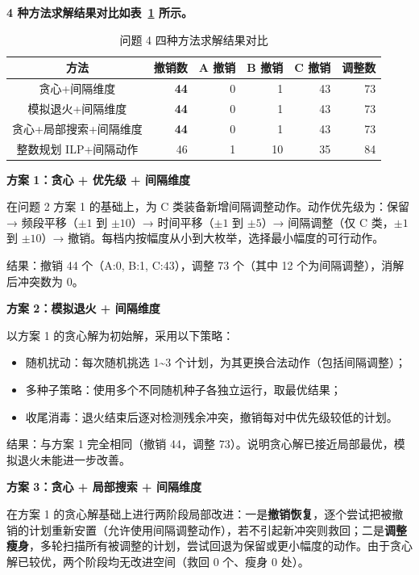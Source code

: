 
\textbf{4 种方法求解结果对比如表~\ref{tab:q4_compare} 所示。}

\begin{table}[htbp]
\centering
\caption{问题 4 四种方法求解结果对比}
\label{tab:q4_compare}
\begin{tabular}{crrrrr}
\toprule
方法 & 撤销数 & A 撤销 & B 撤销 & C 撤销 & 调整数 \\
\midrule
贪心+间隔维度 & \textbf{44} & 0 & 1 & 43 & 73 \\
模拟退火+间隔维度 & \textbf{44} & 0 & 1 & 43 & 73 \\
贪心+局部搜索+间隔维度 & \textbf{44} & 0 & 1 & 43 & 73 \\
整数规划 ILP+间隔动作 & 46 & 1 & 10 & 35 & 84 \\
\bottomrule
\end{tabular}
\end{table}

\textbf{方案 1：贪心 + 优先级 + 间隔维度}

在问题 2 方案 1 的基础上，为 C 类装备新增间隔调整动作。动作优先级为：保留 → 频段平移（$\pm 1$ 到 $\pm 10$）→ 时间平移（$\pm 1$ 到 $\pm 5$）→ 间隔调整（仅 C 类，$\pm 1$ 到 $\pm 10$）→ 撤销。每档内按幅度从小到大枚举，选择最小幅度的可行动作。

结果：撤销 44 个（A:0, B:1, C:43），调整 73 个（其中 12 个为间隔调整），消解后冲突数为 0。

\textbf{方案 2：模拟退火 + 间隔维度}

以方案 1 的贪心解为初始解，采用以下策略：
\begin{itemize}
    \item 随机扰动：每次随机挑选 1\textasciitilde3 个计划，为其更换合法动作（包括间隔调整）；
    \item 多种子策略：使用多个不同随机种子各独立运行，取最优结果；
    \item 收尾消毒：退火结束后逐对检测残余冲突，撤销每对中优先级较低的计划。
\end{itemize}

结果：与方案 1 完全相同（撤销 44，调整 73）。说明贪心解已接近局部最优，模拟退火未能进一步改善。

\textbf{方案 3：贪心 + 局部搜索 + 间隔维度}

在方案 1 的贪心解基础上进行两阶段局部改进：一是\textbf{撤销恢复}，逐个尝试把被撤销的计划重新安置（允许使用间隔调整动作），若不引起新冲突则救回；二是\textbf{调整瘦身}，多轮扫描所有被调整的计划，尝试回退为保留或更小幅度的动作。由于贪心解已较优，两个阶段均无改进空间（救回 0 个、瘦身 0 处）。

